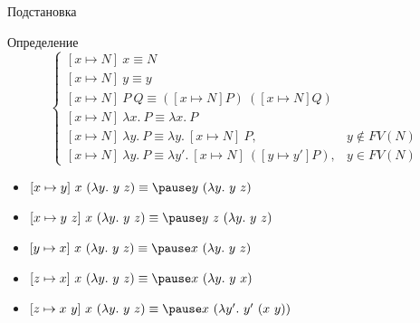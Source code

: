     \begin{frame}[fragile]{Подстановка}
        \begin{block}{Определение}
            \begin{equation}
                \nonumber
                \begin{cases}
                [x \mapsto N]
                    ~ x \equiv N \\
                    [x \mapsto N] ~ y \equiv y \\
                    [x \mapsto N] ~ P ~ Q \equiv ([x \mapsto N] P) ~ ([x \mapsto N] Q) \\
                    [x \mapsto N] ~ \lambda x. ~ P \equiv \lambda x. ~ P \\
                    [x \mapsto N] ~ \lambda y. ~ P \equiv \lambda y. ~ [x \mapsto N] ~ P, & y \not\in FV(N) \\
                    [x \mapsto N] ~ \lambda y. ~ P \equiv \lambda y'. ~ [x \mapsto N] ~ ([y \mapsto y'] P), & y \in FV(N)
                \end{cases}
            \end{equation}
        \end{block}
        \begin{itemize}
            \item[\todo] $[x \mapsto y] ~ x ~ (\lambda y. ~ y ~ z) \equiv \pause y ~ (\lambda y. ~ y ~ z)$
            \item[\todo] $[x \mapsto y ~ z] ~ x ~ (\lambda y. ~ y ~ z) \equiv \pause y ~ z ~ (\lambda y. ~ y ~ z)$
            \item[\todo] $[y \mapsto x] ~ x ~ (\lambda y. ~ y ~ z) \equiv \pause x ~ (\lambda y. ~ y ~ z)$
            \item[\todo] $[z \mapsto x] ~ x ~ (\lambda y. ~ y ~ z) \equiv \pause x ~ (\lambda y. ~ y ~ x)$
            \item[\todo] $[z \mapsto x ~ y] ~ x ~ (\lambda y. ~ y ~ z) \equiv \pause x ~ (\lambda y'. ~ y' ~ (x ~ y))$
        \end{itemize}
    \end{frame}

